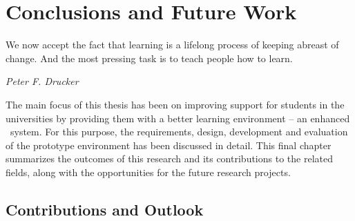 \chapter{Conclusions and Future Work\label{cha:conclusion}}
\epigraph{We now accept the fact that learning is a lifelong process of keeping
abreast of change. And the most pressing task is to teach people how to
learn.}{\textit{Peter F. Drucker}}
The main focus of this thesis has been on improving \LLLs support for students
in the universities by providing them with a better learning environment -- an
enhanced \ep~system. For this purpose, the requirements, design, development and
evaluation of the prototype environment has been discussed in detail. This final
chapter summarizes the outcomes of this research and its contributions to the
related fields, along with the opportunities for the future research projects.

\section{Contributions and Outlook}

